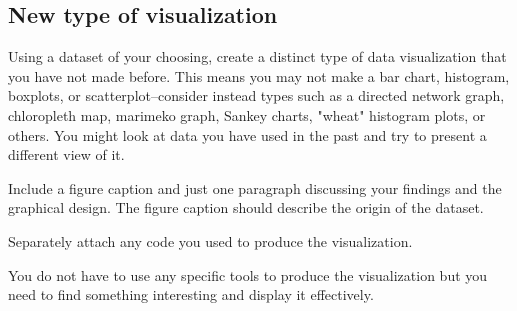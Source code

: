 \documentclass[]{book}
\theoremstyle{definition}
\newtheorem*{soln}{Solution}
\begin{document}
\begin{enumerate}
\subsection*{New type of visualization}

Using a dataset of your choosing, create a distinct type of data visualization that you have not made before. This means you may not make a bar chart, histogram, boxplots, or scatterplot–consider instead types such as a directed network graph, chloropleth map, marimeko graph, Sankey charts, "wheat" histogram plots, or others.  You might look at data you have used in the past and try to present a different view of it.  

Include a figure caption and just one paragraph discussing your findings and the graphical design. 
The figure caption should describe the origin of the dataset.

Separately attach any code you used to produce the visualization.

You do not have to use any specific tools to produce the visualization but you need to find something interesting and display it effectively.


\end{enumerate}
\end{document}
